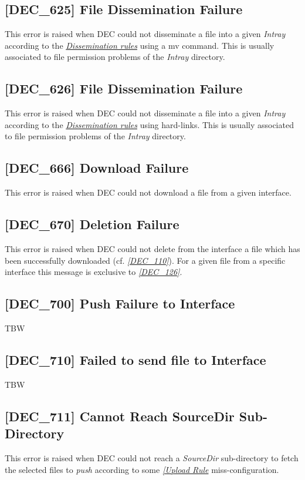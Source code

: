 \documentclass[dec_sum_main.tex]{subfiles}
\begin{document}
\subsection{[DEC\_625] File Dissemination Failure}
\label{DEC625}
This error is raised when DEC could not disseminate a file into a given \textit{Intray} according to the \hyperref[Dissemination rules]{\textit{Dissemination rules}} using a mv command. This is usually associated to file permission problems of the \textit{Intray} directory.

\subsection{[DEC\_626] File Dissemination Failure}
\label{DEC625}
This error is raised when DEC could not disseminate a file into a given \textit{Intray} according to the \hyperref[Dissemination rules]{\textit{Dissemination rules}} using hard-links. This is usually associated to file permission problems of the \textit{Intray} directory.

\subsection{[DEC\_666] Download Failure}
\label{DEC666}
This error is raised when DEC could not download a file from a given interface.

\label{DEC670}
\subsection{[DEC\_670] Deletion Failure}
This error is raised when DEC could not delete from the interface a file which has been successfully downloaded (cf. \hyperref[DEC110]{\textit{[DEC\_110]}}).
For a given file from a specific interface this message is exclusive to \hyperref[DEC126]{\textit{[DEC\_126]}}.

\label{DEC700}
\subsection{[DEC\_700] Push Failure to Interface}
TBW

\label{DEC710}
\subsection{[DEC\_710] Failed to send file to Interface}
TBW

\label{DEC711}
\subsection{[DEC\_711] Cannot Reach SourceDir Sub-Directory}
This error is raised when DEC could not reach a \textit{SourceDir} sub-directory to fetch the selected files to \textit{push} according to some \hyperref[Upload Rules]{\textit{[Upload Rule}} miss-configuration.
\end{document}
